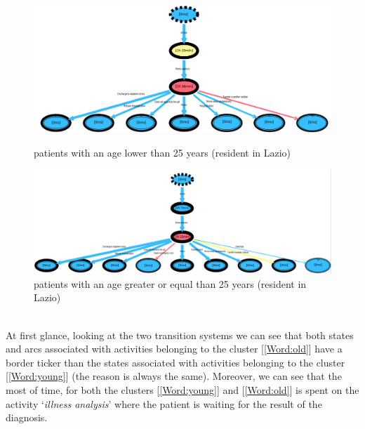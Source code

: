 \begin{figure} [htbp]
\includegraphics[width=\textwidth , keepaspectratio]{ProntoSoccorsoSojournYoungs}
\caption{patients with an age lower than 25 years (resident in Lazio)}
\includegraphics[width=\textwidth , keepaspectratio]{ProntoSoccorsoSojournOlds}
\caption{patients with an age greater or equal than 25 years (resident in Lazio)}
\end{figure} \\
At first glance, looking at the two transition systems we can see that both states and arcs associated with activities belonging to the cluster [\ref{Word:old}] have a border ticker than the states associated with activities belonging to the cluster [\ref{Word:young}] (the reason is always the same). Moreover, we can see that the most of time, for both the clusters [\ref{Word:young}] and [\ref{Word:old}] is spent on the activity `\textit{illness analysis}' where the patient is waiting for the result of the diagnosis.
\clearpage
